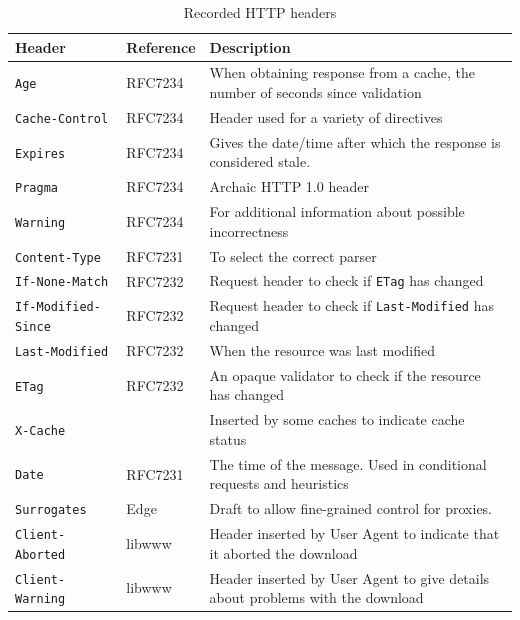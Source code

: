 \documentclass{llncs}
\newcommand{\httph}[1]{\texttt{#1}}
\begin{document}
\begin{subappendices}
\begin{table}
\caption{Recorded HTTP headers}\label{tab:headers}
 \begin{tabular}{ | l |  p{1.4cm} | p{6.8cm} |}
    \hline
    Header & Reference & Description \\ \hline
\httph{Age} & RFC7234 & When obtaining response from a cache, the number of
seconds since validation \\ \hline
\httph{Cache-Control} & RFC7234 & Header used for a variety of directives \\ \hline
\httph{Expires} & RFC7234  & Gives the date/time after which the
   response is considered stale. \\ \hline
\httph{Pragma} & RFC7234 & Archaic HTTP 1.0 header  \\ \hline
\httph{Warning} & RFC7234  & For additional information about possible incorrectness \\ \hline
\httph{Content-Type} & RFC7231 & To select the correct parser \\ \hline
\httph{If-None-Match} & RFC7232  & Request header to check if
                                   \httph{ETag} has changed   \\ \hline
\httph{If-Modified-Since} & RFC7232  & Request header to check if
                                   \httph{Last-Modified} has changed    \\ \hline
\httph{Last-Modified} & RFC7232 & When the resource was last modified \\ \hline
\httph{ETag} & RFC7232 & An opaque validator to check if the resource
has changed  \\ \hline
\httph{X-Cache} &  & Inserted by some caches to indicate cache status \\ \hline
\httph{Date} & RFC7231 & The time of the message. Used in conditional requests
and heuristics \\ \hline
\httph{Surrogates} & Edge \cite{edgearch} & Draft
to allow fine-grained control for proxies. \\ \hline
\httph{Client-Aborted} & libwww  & Header inserted by User
Agent to indicate that it aborted the download \\ \hline
\httph{Client-Warning} & libwww  & Header inserted by User
Agent to give details about problems with the download \\ \hline

    \hline
    \end{tabular}
\end{table}



\end{subappendices}
\end{document}
